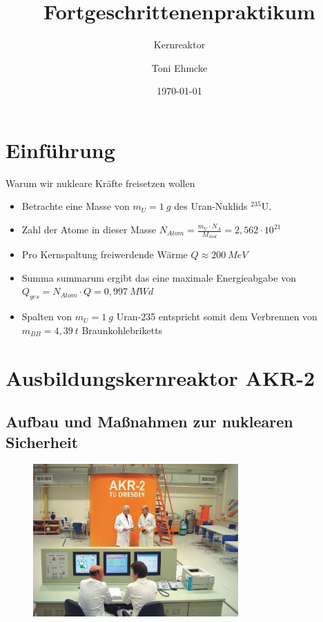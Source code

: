 \documentclass[10pt]{beamer}
\title{Fortgeschrittenenpraktikum}
\subtitle{Kernreaktor}
\author{Toni Ehmcke}
\institute{TU Dresden}
\date{\today}
\begin{document}
\maketitle

\section{Einführung}
	\begin{frame}{Warum wir nukleare Kräfte freisetzen wollen}
		\begin{itemize}
		\item Betrachte eine Masse von $m_U = 1\ \unit{g}$ des Uran-Nuklids $^{235}$U.\\
		\item Zahl der Atome in dieser Masse $N_{Atom} = \frac{m_U\cdot N_A}{M_{mol}} = 2,562 \cdot 10^{21}$
		\item Pro Kernspaltung freiwerdende Wärme $Q \approx 200\ \unit{MeV}$
		\item Summa summarum ergibt das eine maximale Energieabgabe von $Q_{ges}=N_{Atom}\cdot Q = 0,997\ \unit{MWd}$ 
		\item Spalten von $m_U = 1\ \unit{g}$ Uran-235 entspricht somit dem Verbrennen von $m_{BB} =4,39\ \unit{t}$ Braunkohlebriketts 
		\end{itemize}
	\end{frame}

\section{Ausbildungskernreaktor AKR-2} 
	\subsection{Aufbau und Maßnahmen zur nuklearen Sicherheit}
		\begin{frame}{}
				\begin{figure}[ht]
					\centering
					\includegraphics[width=0.7\textwidth]{pic/akr2.png}\\
				\end{figure}	
		\end{frame}
	
\end{document}
